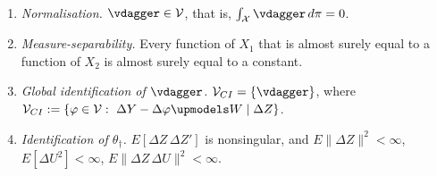 \begin{assumption}[A1b: Identification]\label{ass:ident}~
\begin{enumerate}
\item[(i)] \emph{Normalisation.} $\vdagger\in\mathcal V$, that is, $\int_{\mathcal X}\vdagger\,d\pi=0$.
\item[(ii)] \emph{Measure-separability.} Every function of $X_1$ that is almost surely equal to a
function of $X_2$ is almost surely equal to a constant.
\item[(iii)] \emph{Global identification of $\vdagger$.} $\mathcal V_{CI}=\{\vdagger\}$, where
$\mathcal V_{CI}:=\{\varphi\in\mathcal V:\ \Delta Y-\Delta\varphi\upmodels W\mid\Delta Z\}$.
\item[(iv)] \emph{Identification of $\theta_\dagger$.} $E[\Delta Z\,\Delta Z']$ is nonsingular, and
$E\|\Delta Z\|^{2}<\infty$, $E[\Delta U^{2}]<\infty$, $E\|\Delta Z\,\Delta U\|^{2}<\infty$.
\end{enumerate}
\end{assumption}

